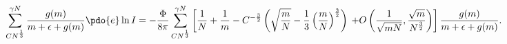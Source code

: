 \begin{equation}
\label{Eq_A41}
\sum^{\gamma N}_{CN^{\frac{1}{3}}}
  \frac{g(m)}{m + \epsilon + g(m)} \pdo{e} \ln I
  = - \frac{\Phi}{8\pi} \sum^{\gamma N}_{CN^{\frac{1}{3}}}
  \left[
  \frac{1}{N} + \frac{1}{m} - C^{-\frac{3}{2}}
    \left(
    \sqrt{\frac{m}{N}} - \frac{1}{3}
    \left(\frac{m}{N}\right)^{\frac{3}{2}}
    \right)
  \right.
  \left.
  + O\left(\frac{1}{\sqrt{mN}},\frac{\sqrt{m}}{N^{\frac{3}{2}}}\right)
  \right]
  \frac{g(m)}{m + \epsilon + g(m)}.
\end{equation}

